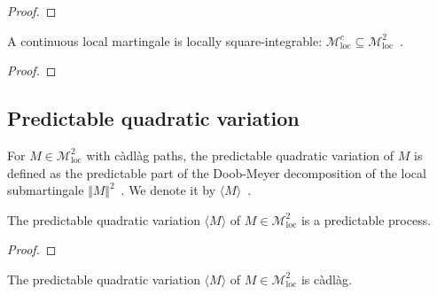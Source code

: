 \begin{proof}\leanok

\end{proof}


\begin{lemma}\label{lem:IsLocalMartingale.isLocallySquareIntegrable_of_continuous}
A continuous local martingale is locally square-integrable: $\mathcal{M}^c_{\mathrm{loc}} \subseteq \mathcal{M}^2_{\mathrm{loc}}$~.
\end{lemma}

\begin{proof}

\end{proof}



\subsection{Predictable quadratic variation}


\begin{definition}\label{def:quadraticVariation}
  \leanok
For $M \in \mathcal{M}^2_{\mathrm{loc}}$ with càdlàg paths, the predictable
quadratic variation of $M$ is defined as the predictable part of the Doob-Meyer decomposition of the local submartingale $\Vert M \Vert^2$~.
We denote it by $\langle M \rangle$~.
\end{definition}


\begin{lemma}\label{lem:predictable_quadraticVariation}
  \leanok
The predictable quadratic variation $\langle M \rangle$ of $M \in \mathcal{M}^2_{\mathrm{loc}}$ is a predictable process.
\end{lemma}

\begin{proof}\leanok

\end{proof}


\begin{lemma}\label{lem:cadlag_quadraticVariation}
  \leanok
The predictable quadratic variation $\langle M \rangle$ of $M \in \mathcal{M}^2_{\mathrm{loc}}$ is càdlàg.
\end{lemma}

